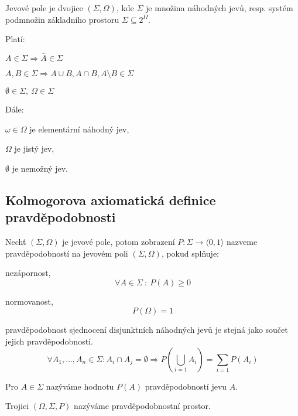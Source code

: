 \begin{compactitem}
    \item Jevové pole je dvojice $(\Sigma, \Omega)$, kde $\Sigma$ je množina náhodných jevů, resp. systém podmnožin základního prostoru $\Sigma \subseteq 2^{\Omega}$.

    \item Platí: \begin{compactenum}
        \item $ A \in \Sigma \Rightarrow \bar{A} \in \Sigma $
        \item $ A, B \in \Sigma \Rightarrow A \cup B, A \cap B, A \setminus B \in \Sigma $
        \item $ \emptyset \in \Sigma,~ \Omega \in \Sigma $
    \end{compactenum}

    \item Dále: \begin{compactitem}
        \item $\omega \in \Omega$ je elementární náhodný jev,
        \item $\Omega$ je jistý jev,
        \item $\emptyset$ je nemožný jev.
    \end{compactitem}

\end{compactitem}

\subsection{Kolmogorova axiomatická definice pravděpodobnosti}

\begin{compactitem}
    \item Nechť $(\Sigma, \Omega)$ je jevové pole, potom zobrazení $P : \Sigma \rightarrow \langle 0, 1 \rangle$ nazveme pravděpodobností na jevovém poli $(\Sigma, \Omega)$, pokud splňuje: \begin{compactitem}
        \item nezápornost,
        $$\forall A \in \Sigma ~:~ P(A) \geq 0$$
        \item normovanost,
        $$ P(\Omega) = 1 $$
        \item pravděpodobnost sjednocení disjunktních náhodných jevů je stejná jako součet jejich pravděpodobností.
        $$ \forall A_1, \ldots, A_n \in \Sigma : A_i \cap A_j = \emptyset \Rightarrow P \left( \bigcup_{i=1} A_i \right) = \sum_{i=1} P(A_i) $$
    \end{compactitem}

    \item Pro $A \in \Sigma$ nazýváme hodnotu $P(A)$ pravděpodobností jevu $A$.

    \item Trojici $ (\Omega, \Sigma, P) $ nazýváme pravděpodobnostní prostor.
\end{compactitem}

